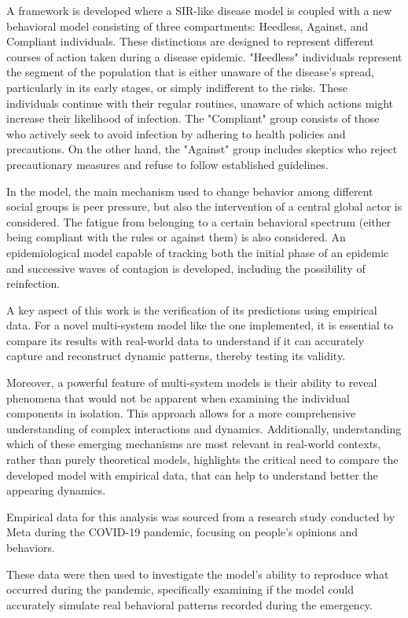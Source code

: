 A framework is developed where a SIR-like disease model is coupled with a new behavioral model consisting of three compartments: Heedless, Against, and Compliant individuals. These distinctions are designed to represent different courses of action taken during a disease epidemic.
"Heedless" individuals represent the segment of the population that is either unaware of the disease’s spread, particularly in its early stages, or simply indifferent to the risks. These individuals continue with their regular routines, unaware of which actions might increase their likelihood of infection.
The "Compliant" group consists of those who actively seek to avoid infection by adhering to health policies and precautions. On the other hand, the "Against" group includes skeptics who reject precautionary measures and refuse to follow established guidelines.

In the model, the main mechanism used to change behavior among different social groups is peer pressure, but also the intervention of a central global actor is considered. The fatigue from belonging to a certain behavioral spectrum (either being compliant with the rules or against them) is also considered. An epidemiological model capable of tracking both the initial phase of an epidemic and successive waves of contagion is developed, including the possibility of reinfection.

A key aspect of this work is the verification of its predictions using empirical data. For a novel multi-system model like the one implemented, it is essential to compare its results with real-world data to understand if it can accurately capture and reconstruct dynamic patterns, thereby testing its validity.

Moreover, a powerful feature of multi-system models is their ability to reveal phenomena that would not be apparent when examining the individual components in isolation. This approach allows for a more comprehensive understanding of complex interactions and dynamics. 
Additionally, understanding which of these emerging mechanisms are most relevant in real-world contexts, rather than purely theoretical models, highlights the critical need to compare the developed model with empirical data, that can help to understand better the appearing dynamics. 

Empirical data for this analysis was sourced from a research study conducted by Meta during the COVID-19 pandemic, focusing on people's opinions and behaviors.

These data were then used to investigate the model's ability to reproduce what occurred during the pandemic, specifically examining if the model could accurately simulate real behavioral patterns recorded during the emergency.

